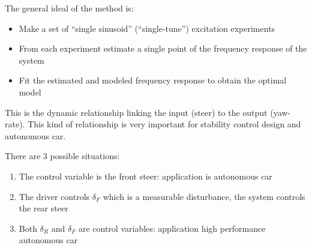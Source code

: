 
The general ideal of the method is:
\begin{itemize}
    \item Make a set of ``single sinusoid'' (``single-tune'') excitation experiments
    \item From each experiment estimate a single point of the frequency response of the system
    \item Fit the estimated and modeled frequency response to obtain the optimal model
\end{itemize}

\begin{example}

    This is the dynamic relationship linking the input (steer) to the output (yaw-rate).
    This kind of relationship is very important for stability control design and autonomous car.

    There are 3 possible situations:
    \begin{figure}[H]
        \centering
    \end{figure}

    \begin{enumerate}
        \item The control variable is the front steer: application is autonomous car
        \item The driver controls $\delta_F$ which is a measurable disturbance, the system controls the rear steer
        \item Both $\delta_R$ and $\delta_F$ are control variables: application high performance autonomous car
    \end{enumerate}
\end{example}

